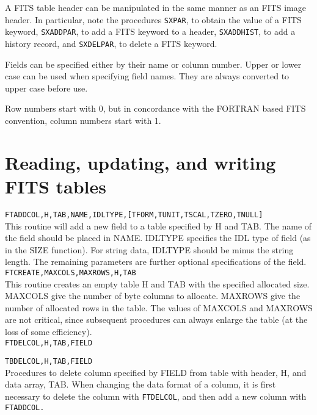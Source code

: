 \documentclass[twoside,12pt]{article}
\begin{document}
A FITS table header can be manipulated in the same manner as an FITS 
image header.
In particular, note the procedures {\tt SXPAR}, to obtain the value of a FITS
keyword, {\tt SXADDPAR}, to add a FITS keyword to a header, {\tt SXADDHIST}, to add
a history record, and {\tt SXDELPAR}, to delete a FITS keyword.

Fields can be specified either by their name or column number.   
Upper or lower case can be used when specifying field names.
They are always converted to upper case before use.

Row numbers start with 0, but in concordance with the FORTRAN based
FITS convention, column numbers start with 1.
                          
\section{Reading, updating, and writing FITS tables}

{\tt FTADDCOL,H,TAB,NAME,IDLTYPE,[TFORM,TUNIT,TSCAL,TZERO,TNULL]} \\

	This routine will add a new field to a table specified by
        H and TAB.  The name of the field should be placed in NAME.
        IDLTYPE specifies the IDL type of field (as in the SIZE
        function).  For string data, IDLTYPE should be minus the
        string length.  The remaining parameters are further optional
        specifications of the field.   \\
 
{\tt FTCREATE,MAXCOLS,MAXROWS,H,TAB} \\

	This routine creates an empty table H and TAB with the 
	specified allocated size.  MAXCOLS give the number of
        byte columns to allocate.  MAXROWS give the number of 
        allocated rows in the table.  The values of MAXCOLS and
        MAXROWS are not critical, since subsequent procedures
        can always enlarge the table (at the loss of some 
        efficiency). \\

{\tt FTDELCOL,H,TAB,FIELD} 

{\tt TBDELCOL,H,TAB,FIELD} \\

        Procedures to delete column specified by FIELD from table
        with header, H, and data array, TAB.   When changing the
        data format of a column, it is first necessary to delete
        the column with {\tt FTDELCOL}, and then add a new column with
        {\tt FTADDCOL.}  \\
\end{document}
